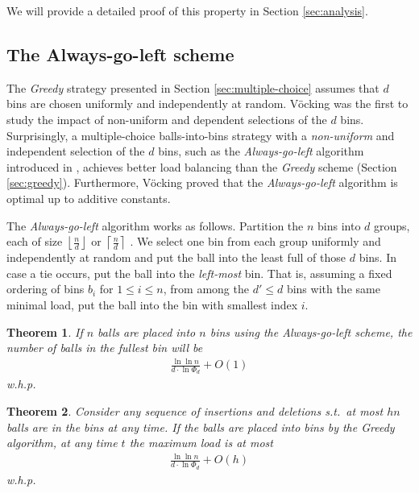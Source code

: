 \documentclass[a4paper,12pt]{article}
\newtheorem{theorem}{Theorem}
\begin{document}
We will provide a detailed proof of this property in Section \ref{sec:analysis}.

\subsection{The Always-go-left scheme}
\label{sec:AlwaysGoLeft}
The \emph{Greedy} strategy presented in Section \ref{sec:multiple-choice} assumes that $d$ bins are chosen uniformly and independently at random. V\"ocking \cite{VOC03} was the first to study the impact of non-uniform and dependent selections of the $d$ bins. Surprisingly, a multiple-choice balls-into-bins strategy with a \emph{non-uniform} and independent selection of the $d$ bins, such as the \emph{Always-go-left} algorithm introduced in \cite{VOC03}, achieves better \cite{BCSV06} load balancing than the \emph{Greedy} scheme (Section \ref{sec:greedy}). Furthermore, V\"ocking proved that the \emph{Always-go-left} algorithm is optimal up to additive constants.

The \emph{Always-go-left} algorithm works as follows. Partition the $n$ bins into $d$ groups, each of size $\left\lfloor \frac{n}{d}\right\rfloor$ or $\left\lceil\frac{n}{d}\right\rceil$ . We select one bin from each group uniformly and independently at random and put the ball into the least full of those $d$ bins. In case a tie occurs, put the ball into the \emph{left-most} bin. That is, assuming a fixed ordering of bins $b_i$ for $1 \leq i \leq n$, from among the $d' \leq d$ bins with the same minimal load, put the ball into the bin with smallest index $i$.

\begin{theorem}
\label{theorem:agln}
If $n$ balls are placed into $n$ bins using the Always-go-left scheme, the number of balls in the fullest bin will be 
\begin{align*}
\frac{\ln\ln n}{d \cdot \ln \Phi_d} + O(1)
\end{align*}
w.h.p.
\end{theorem}

\begin{theorem}
\label{theorem:algm}
Consider any sequence of insertions and deletions s.t.~at most $hn$ balls are in the bins at any time. If the balls are placed into bins by the Greedy algorithm, at any time $t$ the maximum load is at most 
\begin{align*}
\frac{\ln\ln n}{d \cdot \ln \Phi_d} + O(h)
\end{align*}
w.h.p.
\end{theorem}
\end{document}
